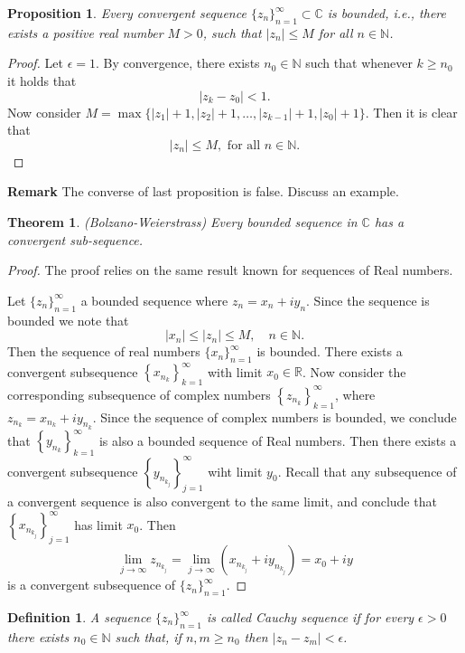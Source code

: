 \documentclass{amsart}
\newtheorem{thm}{Theorem}
\newtheorem{prop}{Proposition}
\newtheorem{mydef}{Definition}
\begin{document}
\begin{prop}
Every convergent sequence \(\{z_n\}_{n=1}^{\infty} \subset \mathbb{C}\) is bounded, i.e., there exists
a positive real number \(M>0\), such that \(|z_n| \leq M\) for all \(n\in\mathbb{N}\).
\end{prop}
\begin{proof}
Let \(\epsilon = 1\). By convergence, there exists \(n_0\in \mathbb{N}\) such that whenever \(k\geq n_0\) it holds that 
\[ |z_k - z_0 | < 1. \]
Now consider \(M = \max\{ |z_1| + 1, |z_2| + 1, \ldots, |z_{k-1}| + 1, |z_0| + 1\}\). Then it is clear that \[ |z_n| \leq M, \mbox{ for all } n \in \mathbb{N}. \]
\end{proof}

\textbf{Remark} The converse of last proposition is false. Discuss an example.

\begin{thm}
(Bolzano-Weierstrass) Every bounded sequence in \(\mathbb{C}\) has a convergent sub-sequence.
\end{thm}
\begin{proof}
The proof relies on the same result known for sequences of Real numbers.

Let \(\{z_n\}_{n=1}^{\infty}\) a bounded sequence where \(z_n = x_n + iy_n\). Since the sequence is bounded we note  that 
\[ |x_n | \leq |z_n| \leq M, \quad n\in\mathbb{N}. \]
Then the sequence of real numbers \(\{x_n\}_{n=1}^{\infty}\) is bounded. There exists a convergent subsequence \(\left\{x_{n_k}\right\}_{k=1}^{\infty}\) with limit \(x_0\in \mathbb{R}\).
Now consider the corresponding subsequence of complex numbers \(\left\{z_{n_k}\right\}_{k=1}^{\infty}\), where \(z_{n_k} = x_{n_k} + i y_{n_k}\). Since the sequence of complex numbers is bounded,
we conclude that \(\left\{y_{n_k}\right\}_{k=1}^{\infty}\) is also a bounded sequence of Real numbers. Then there exists a convergent subsequence \(\left\{y_{n_{k_j}}\right\}_{j=1}^{\infty}\) wiht limit \(y_0\).
Recall that any subsequence of a convergent sequence is also convergent to the same limit, and conclude that \(\left\{x_{n_{k_j}}\right\}_{j=1}^{\infty}\) has limit \(x_0\). Then 
\[ \lim_{j\to \infty} z_{n_{k_j}} = \lim_{j\to \infty} \left(x_{n_{k_j}} + i y_{n_{k_j}}\right)  = x_0 + iy \]
is a convergent subsequence of  \(\{z_n\}_{n=1}^{\infty}\).
\end{proof}

\begin{mydef}
A sequence \(\{z_n\}_{n=1}^{\infty}\) is called Cauchy sequence if for every \(\epsilon >0\)
there exists \(n_0\in\mathbb{N}\) such that, if \(n,m \geq n_0\) then \(|z_n - z_m| <\epsilon\).
\end{mydef}
\end{document}
